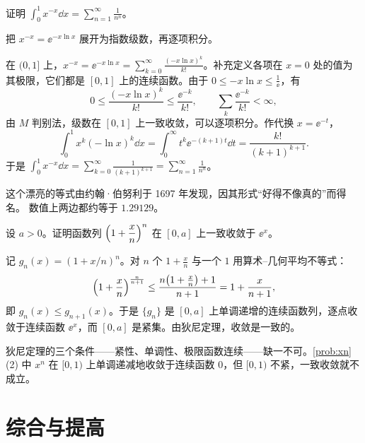 \documentclass{mojing-exercise}
\begin{document}
\begin{problem}[difficulty=3, title=“二年级学生之梦”, space=6cm]
证明 $\displaystyle\int_0^1x^{-x}\dd x=\sum_{n=1}^{\infty}\frac{1}{n^n}$。
\begin{hint}
把 $x^{-x}=\ee^{-x\ln x}$ 展开为指数级数，再逐项积分。
\end{hint}
\end{problem}

\begin{solution}
在 $(0,1]$ 上，$x^{-x}=\ee^{-x\ln x}=\sum_{k=0}^{\infty}\frac{(-x\ln x)^k}{k!}$。补充定义各项在
$x=0$ 处的值为其极限，它们都是 $[0,1]$ 上的连续函数。由于 $0\le-x\ln x\le\frac1\ee$，有
\[
  0\le\frac{(-x\ln x)^k}{k!}\le\frac{\ee^{-k}}{k!},\qquad\sum_k\frac{\ee^{-k}}{k!}<\infty,
\]
由 $M$ 判别法，级数在 $[0,1]$ 上一致收敛，可以逐项积分。作代换 $x=\ee^{-t}$，
\[
  \int_0^1x^k(-\ln x)^k\dd x=\int_0^{\infty}t^k\ee^{-(k+1)t}\dd t=\frac{k!}{(k+1)^{k+1}} .
\]
于是 $\displaystyle\int_0^1x^{-x}\dd x=\sum_{k=0}^{\infty}\frac{1}{(k+1)^{k+1}}=\sum_{n=1}^{\infty}\frac{1}{n^n}$。
\begin{note}
这个漂亮的等式由约翰·伯努利于 1697 年发现，因其形式“好得不像真的”而得名。
数值上两边都约等于 $1.29129$。
\end{note}
\end{solution}

\begin{problem}[difficulty=2, space=4.5cm]
设 $a>0$。证明函数列 $\Bigl(1+\dfrac{x}{n}\Bigr)^n$ 在 $[0,a]$ 上一致收敛于 $\ee^x$。
\end{problem}

\begin{solution}
记 $g_n(x)=(1+x/n)^n$。对 $n$ 个 $1+\frac xn$ 与一个 $1$ 用算术--几何平均不等式：
\[
  \Bigl(1+\frac xn\Bigr)^{\frac{n}{n+1}}\le\frac{n\bigl(1+\frac xn\bigr)+1}{n+1}=1+\frac{x}{n+1},
\]
即 $g_n(x)\le g_{n+1}(x)$。于是 $\{g_n\}$ 是 $[0,a]$ 上单调递增的连续函数列，逐点收敛于连续函数
$\ee^x$，而 $[0,a]$ 是紧集。由狄尼定理，收敛是一致的。
\begin{note}
狄尼定理的三个条件——紧性、单调性、极限函数连续——缺一不可。\cref{prob:xn}(2) 中
$x^n$ 在 $[0,1)$ 上单调递减地收敛于连续函数 $0$，但 $[0,1)$ 不紧，一致收敛就不成立。
\end{note}
\end{solution}

\section{综合与提高}
\end{document}
